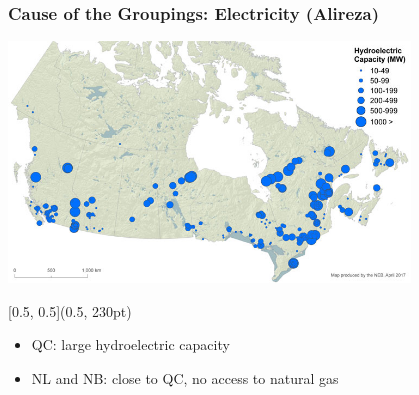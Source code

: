 \documentclass{beamer}
\begin{document}
\begin{frame}
\frametitle{Cause of the Groupings: Electricity (Alireza)}
\vspace{-30pt}
\begin{center}
\includegraphics[width=0.8\textwidth]{hydroPower.jpg}
\end{center}

\begin{textblock*}{\textwidth}[0.5, 0.5](0.5\linewidth, 230pt)
\begin{itemize}
	\item QC: large hydroelectric capacity
	\item  NL and NB: close to QC, no access to natural gas  
\end{itemize}
\end{textblock*}
\end{frame}
\end{document}
